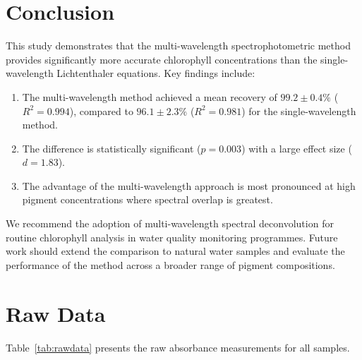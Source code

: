 \documentclass[
    language=english,
    doctype=article,
    institution=none,
    titlestyle=book,
]{../../omnilatex}
\begin{document}
\section{Conclusion}

This study demonstrates that the multi-wavelength spectrophotometric method
provides significantly more accurate chlorophyll concentrations than the
single-wavelength Lichtenthaler equations.  Key findings include:

\begin{enumerate}
    \item The multi-wavelength method achieved a mean recovery of
          $99.2 \pm 0.4\%$ ($R^{2} = 0.994$), compared to
          $96.1 \pm 2.3\%$ ($R^{2} = 0.981$) for the single-wavelength method.
    \item The difference is statistically significant ($p = 0.003$) with a large
          effect size ($d = 1.83$).
    \item The advantage of the multi-wavelength approach is most pronounced at
          high pigment concentrations where spectral overlap is greatest.
\end{enumerate}

We recommend the adoption of multi-wavelength spectral deconvolution for routine
chlorophyll analysis in water quality monitoring programmes.  Future work should
extend the comparison to natural water samples and evaluate the performance of
the method across a broader range of pigment compositions.

\appendix
\section{Raw Data}
\label{app:rawdata}

Table~\ref{tab:rawdata} presents the raw absorbance measurements for all
samples.
\end{document}

